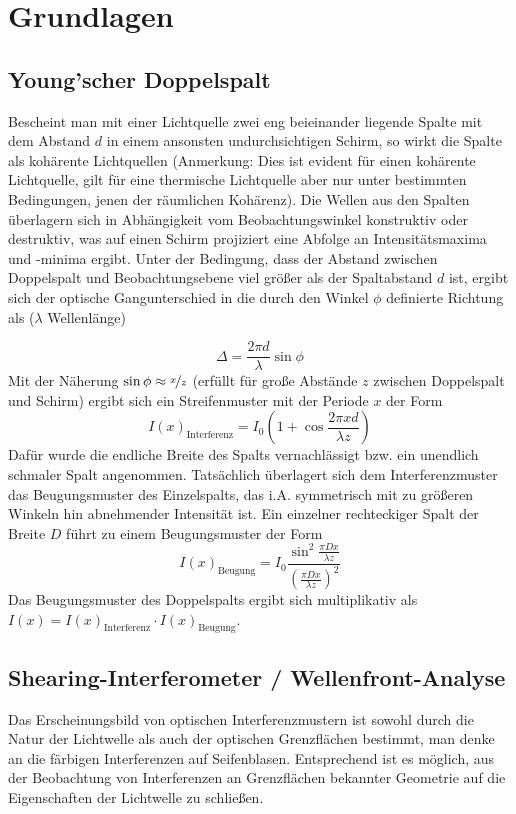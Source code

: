 \documentclass[ngerman]{scrartcl}
\begin{document}
\section{Grundlagen} %
\label{sec:grundlagen}
\subsection{Young'scher Doppelspalt}
\label{sec:grundlagen_youngscher_doppelspalt}
Bescheint man mit einer Lichtquelle zwei eng beieinander liegende Spalte mit dem Abstand $d$ in einem ansonsten undurchsichtigen Schirm, so wirkt die Spalte als kohärente Lichtquellen (Anmerkung: Dies ist evident für einen kohärente Lichtquelle, gilt für eine thermische Lichtquelle aber nur unter bestimmten Bedingungen, jenen der räumlichen Kohärenz). Die Wellen aus den Spalten überlagern sich in Abhängigkeit vom Beobachtungswinkel konstruktiv oder destruktiv, was auf einen Schirm projiziert eine Abfolge an Intensitätsmaxima und -minima ergibt. Unter der Bedingung, dass der Abstand zwischen Doppelspalt und Beobachtungsebene viel größer als der Spaltabstand $d$ ist, ergibt sich der optische Gangunterschied in die durch den Winkel $\phi$ definierte Richtung als ($\lambda$ Wellenlänge)

\begin{equation}
    \Delta = \frac{2 \pi d}{\lambda} \sin \phi
\end{equation}
Mit der Näherung $\sin \phi \approx \nicefrac{x}{z}$ (erfüllt für große Abstände $z$ zwischen Doppelspalt und Schirm) ergibt sich ein Streifenmuster mit der Periode $x$ der Form
\begin{equation}
    I(x)_{\text{Interferenz}} = I_0(1+ \cos \frac{2 \pi x d}{\lambda z})
\end{equation}
Dafür wurde die endliche Breite des Spalts vernachlässigt bzw. ein unendlich schmaler Spalt angenommen. Tatsächlich überlagert sich dem Interferenzmuster das Beugungsmuster des Einzelspalts, das i.A. symmetrisch mit zu größeren Winkeln hin abnehmender Intensität ist. Ein einzelner rechteckiger Spalt der Breite $D$ führt zu einem Beugungsmuster der Form
\begin{equation}
    I(x)_{\text{Beugung}} = I_0 \frac{\sin^2 \frac{\pi D x}{\lambda z}}{\left(\frac{\pi D x}{\lambda z}\right)^2}
\end{equation}
Das Beugungsmuster des Doppelspalts ergibt sich multiplikativ als $I(x) = I(x)_{\text{Interferenz}} \cdot I(x)_{\text{Beugung}}$.
\subsection{Shearing-Interferometer / Wellenfront-Analyse}
\label{sec:grundlagen_shearing_interferometer}
Das Erscheinungsbild von optischen Interferenzmustern ist sowohl durch die Natur der Lichtwelle als auch der optischen Grenzflächen bestimmt, man denke an die färbigen Interferenzen auf Seifenblasen. Entsprechend ist es möglich, aus der Beobachtung von Interferenzen an Grenzflächen bekannter Geometrie auf die Eigenschaften der Lichtwelle zu schließen.
\end{document}
